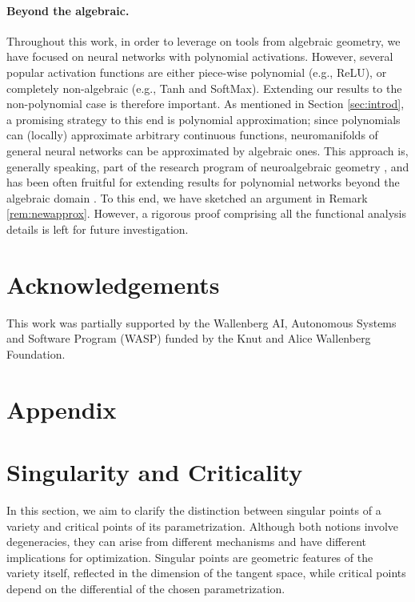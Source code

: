 \documentclass{article} %
\theoremstyle{plain}%
\theoremstyle{definition}
\theoremstyle{remark}
\begin{document}
\paragraph{Beyond the algebraic.} Throughout this work, in order to leverage on tools from algebraic geometry, we have focused on neural networks with polynomial activations. However, several popular activation functions are either piece-wise polynomial (e.g., ReLU), or completely non-algebraic (e.g., Tanh and SoftMax). Extending our results to the non-polynomial case is therefore important. As mentioned in Section \ref{sec:introd}, a promising strategy to this end is polynomial approximation; since polynomials can (locally) approximate arbitrary continuous functions, neuromanifolds of general neural networks can be approximated by algebraic ones. This approach is, generally speaking, part of the research program of neuroalgebraic geometry \citep{marchetti2024harmonics}, and has been often fruitful for extending results for polynomial networks beyond the algebraic domain  \citep{boulle2020rational, zhang2023covering}. 
To this end, we have sketched an argument in Remark \ref{rem:newapprox}. However, a rigorous proof comprising all the functional analysis details is left for future investigation.  



\section*{Acknowledgements}
This work was partially supported by the Wallenberg AI, Autonomous Systems and Software Program (WASP) funded by the Knut and Alice Wallenberg Foundation.




\newpage
\appendix
\section*{Appendix}

\section{Singularity and Criticality}\label{sec:app_sing}
In this section, we aim to clarify the distinction between singular points of a variety and critical points of 
its parametrization. 
Although both notions involve degeneracies, they can arise from different mechanisms and have 
different implications for optimization.
Singular points are geometric features of the variety itself, reflected in 
the dimension of the tangent space, while critical points depend on the differential of the chosen parametrization. 
\end{document}
